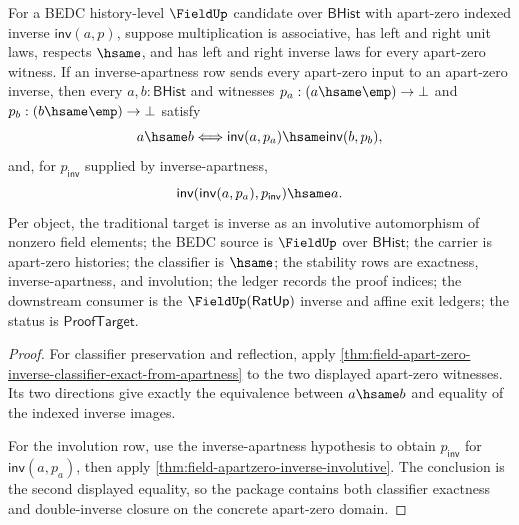 \begin{theorem}
\label{thm:field-apartzero-inverse-classifier-automorphism}
For a BEDC history-level $\FieldUp$ candidate over $\mathsf{BHist}$ with
apart-zero indexed inverse $\mathsf{inv}(a,p)$, suppose multiplication is
associative, has left and right unit laws, respects $\hsame$, and has left and
right inverse laws for every apart-zero witness. If an inverse-apartness row
sends every apart-zero input to an apart-zero inverse, then every
$a,b:\mathsf{BHist}$ and witnesses $p_a:(a\hsame\emp)\to\bot$ and
$p_b:(b\hsame\emp)\to\bot$ satisfy
$$
a\hsame b \Longleftrightarrow
\mathsf{inv}(a,p_a)\hsame\mathsf{inv}(b,p_b),
$$
and, for $p_{\mathsf{inv}}$ supplied by inverse-apartness,
$$
\mathsf{inv}(\mathsf{inv}(a,p_a),p_{\mathsf{inv}})\hsame a.
$$
Per object, the traditional target is inverse as an involutive automorphism of
nonzero field elements; the BEDC source is $\FieldUp$ over $\mathsf{BHist}$;
the carrier is apart-zero histories; the classifier is $\hsame$; the stability
rows are exactness, inverse-apartness, and involution; the ledger records the
proof indices; the downstream consumer is the $\FieldUp(\mathsf{RatUp})$
inverse and affine exit ledgers; the status is $\mathsf{ProofTarget}$.
\end{theorem}
\begin{proof}
For classifier preservation and reflection, apply
\autoref{thm:field-apart-zero-inverse-classifier-exact-from-apartness} to the
two displayed apart-zero witnesses. Its two directions give exactly the
equivalence between $a\hsame b$ and equality of the indexed inverse images.

For the involution row, use the inverse-apartness hypothesis to obtain
$p_{\mathsf{inv}}$ for $\mathsf{inv}(a,p_a)$, then apply
\autoref{thm:field-apartzero-inverse-involutive}. The conclusion is the second
displayed equality, so the package contains both classifier exactness and
double-inverse closure on the concrete apart-zero domain.
\end{proof}
